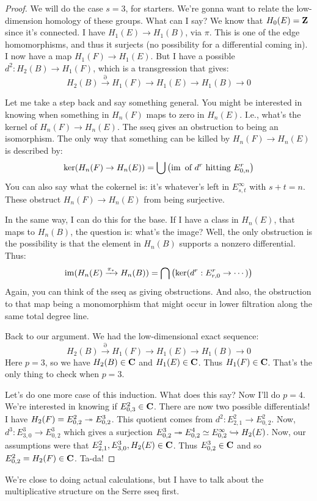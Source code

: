 \begin{proof}
    We will do the case $s=3$, for starters.
    We're gonna want to relate the low-dimension homology of these groups.
    What can I say?
    We know that $H_0(E) = \mathbf Z$ since it's connected.
    I have $H_1(E)\to H_1(B)$, via $\pi$.
    This is one of the edge homomorphisms, and thus it surjects (no possibility for a differential coming in).
    I now have a map $H_1(F)\to H_1(E)$.
    But I have a possible $d^2:H_2(B)\to H_1(F)$, which is a transgression that gives:
    $$
    H_2(B)\xrightarrow{\partial} H_1(F)\to H_1(E)\to H_1(B)\to 0
    $$
    
    Let me take a step back and say something general.
    You might be interested in knowing when something in $H_n(F)$ maps to zero in $H_n(E)$.
    I.e., what's the kernel of $H_n(F)\to H_n(E)$.
    The sseq gives an obstruction to being an isomorphism.
    The only way that something can be killed by $H_n(F)\to H_n(E)$ is described by:
    $$
    \ker(H_n(F)\to H_n(E)) = \bigcup\left(\operatorname{im} \text{ of }d^r\text{ hitting }E^r_{0,n}\right)
    $$
    You can also say what the cokernel is:
    it's whatever's left in $E^\infty_{s,t}$ with $s+t = n$.
    These obstruct $H_n(F)\to H_n(E)$ from being surjective.
    
    In the same way, I can do this for the base.
    If I have a class in $H_n(E)$, that maps to $H_n(B)$, the question is: what's the image?
    Well, the only obstruction is the possibility is that the element in $H_n(B)$ supports a nonzero differential.
    Thus:
    $$
    \operatorname{im}(H_n(E)\xrightarrow{\pi_\ast} H_n(B)) = \bigcap\left(\ker(d^r:E^r_{r,0}\to\cdots)\right)
    $$
    Again, you can think of the sseq as giving obstructions.
    And also, the obstruction to that map being a monomorphism that might occur in lower filtration along the same total degree line.

    Back to our argument.
    We had the low-dimensional exact sequence:
    $$
    H_2(B)\xrightarrow{\partial} H_1(F)\to H_1(E)\to H_1(B)\to 0
    $$
    Here $p=3$, so we have $H_2(B)\in\mathbf C$ and $H_1(E)\in\mathbf C$.
    Thus $H_1(F)\in\mathbf C$.
    That's the only thing to check when $p=3$.

    Let's do one more case of this induction.
    What does this say?
    Now I'll do $p=4$.
    We're interested in knowing if $E^2_{0,3}\in\mathbf C$.
    There are now two possible differentials!
    I have $H_2(F) = E^2_{0,2}\twoheadrightarrow E^3_{0,2}$.
    This quotient comes from $d^2:E^2_{2,1}\to E^2_{0,2}$.
    Now, $d^3:E^3_{3,0}\to E^3_{0,2}$ which gives a surjection $E^3_{0,2}\twoheadrightarrow E^4_{0,2}\simeq E^\infty_{0,2}\hookrightarrow H_2(E)$.
    Now, our assumptions were that $E^2_{2,1},E^3_{3,0},H_2(E)\in\mathbf C$.
    Thus $E^3_{0,2}\in\mathbf C$ and so $E^2_{0,2} = H_2(F)\in\mathbf C$.
    Ta-da!
\end{proof}
We're close to doing actual calculations, but I have to talk about the multiplicative structure on the Serre sseq first.
